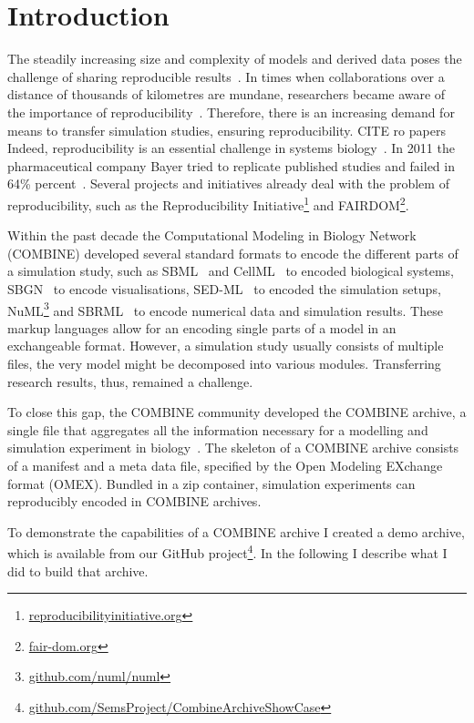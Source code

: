 
\section{Introduction}

The steadily increasing size and complexity of models and derived data poses the challenge of sharing reproducible results~\cite{scharm2014}.
In times when collaborations over a distance of thousands of kilometres are mundane, researchers became aware of the importance of reproducibility~\cite{Sandve2013}.
Therefore, there is an increasing demand for means to transfer simulation studies, ensuring reproducibility. CITE ro papers
Indeed, reproducibility is an essential challenge in systems biology~\cite{Mesirov2010}.
In 2011 the pharmaceutical company Bayer tried to replicate published studies and failed in 64\% percent~\cite{Prinz2011}.
Several projects and initiatives already deal with the problem of reproducibility, such as the Reproducibility Initiative\footnote{\href{http://reproducibilityinitiative.org/}{reproducibilityinitiative.org}} and FAIRDOM\footnote{\href{http://fair-dom.org/}{fair-dom.org}}.

Within the past decade the Computational Modeling in Biology Network (COMBINE) developed several standard formats to encode the different parts of a simulation study, such as SBML~\cite{Hucka2003} and CellML~\cite{Cuellar2003a} to encoded biological systems, SBGN~\cite{sbgn} to encode visualisations, SED-ML~\cite{Waltemath2011} to encoded the simulation setups, NuML\footnote{\href{https://github.com/numl/numl}{github.com/numl/numl}} and SBRML~\cite{Dada2010} to encode numerical data and simulation results.
These markup languages allow for an encoding single parts of a model in an exchangeable format.
However, a simulation study usually consists of multiple files, the very model might be decomposed into various modules.
Transferring research results, thus, remained a challenge.

To close this gap, the COMBINE community developed the COMBINE archive, a single file that aggregates all the information necessary for a modelling and simulation experiment in biology~\cite{Bergmann2014}.
The skeleton of a COMBINE archive consists of a manifest and a meta data file, specified by the Open Modeling EXchange format (OMEX).
Bundled in a zip container, simulation experiments can reproducibly encoded in COMBINE archives.

To demonstrate the capabilities of a COMBINE archive I created a demo archive, which is available from our GitHub project\footnote{\href{https://github.com/SemsProject/CombineArchiveShowCase}{github.com/SemsProject/CombineArchiveShowCase}}.
In the following I describe what I did to build that archive.

